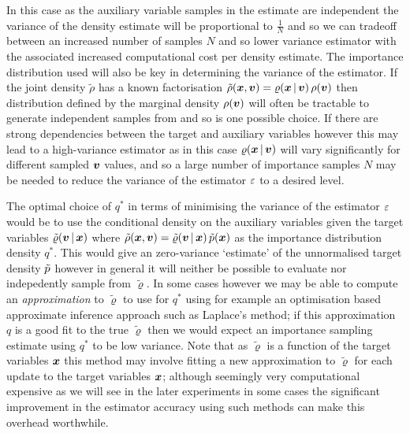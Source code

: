 In this case as the auxiliary variable samples in the estimate are independent the variance of the density estimate will be proportional to $\frac{1}{N}$ and so we can tradeoff between an increased number of samples $N$ and so lower variance estimator with the associated increased computational cost per density estimate. The importance distribution used will also be key in determining the variance of the estimator. If the joint density $\tilde{\rho}$ has a known factorisation $\tilde{\rho}(\boldsymbol{x},\boldsymbol{v}) = \varrho(\boldsymbol{x}\operatorname{|}\boldsymbol{v})\,\rho(\boldsymbol{v})$ then distribution defined by the marginal density $\rho(\boldsymbol{v})$ will often be tractable to generate independent samples from and so is one possible choice. If there are strong dependencies between the target and auxiliary variables however this may lead to a high-variance estimator as in this case $\varrho(\boldsymbol{x}\operatorname{|}\boldsymbol{v})$ will vary significantly for different sampled $\boldsymbol{v}$ values, and so a large number of importance samples $N$ may be needed to reduce the variance of the estimator $\varepsilon$ to a desired level. 

The optimal choice of $q^*$ in terms of minimising the variance of the estimator $\varepsilon$ would be to use the conditional density on the auxiliary variables given the target variables $\tilde{\varrho}(\boldsymbol{v}\operatorname{|}\boldsymbol{x})$ where $\tilde{\rho}(\boldsymbol{x},\boldsymbol{v}) = \tilde{\varrho}(\boldsymbol{v}\operatorname{|}\boldsymbol{x})\,\tilde{p}(\boldsymbol{x})$ as the importance distribution density $q^*$. This would give an zero-variance `estimate' of the unnormalised target density $\tilde{p}$ however in general it will neither be possible to evaluate nor indepedently sample from $\tilde{\varrho}$. In some cases however we may be able to compute an \emph{approximation} to $\tilde{\varrho}$ to use for $q^*$ using for example an optimisation based approximate inference approach such as Laplace's method; if this approximation $q$ is a good fit to the true $\tilde{\varrho}$ then we would expect an importance sampling estimate using $q^*$ to be low variance. Note that as $\tilde{\varrho}$ is a function of the target variables $\boldsymbol{x}$ this method may involve fitting a new approximation to $\tilde{\varrho}$ for each update to the target variables $\boldsymbol{x}$; although seemingly very computational expensive as we will see in the later experiments in some cases the significant improvement in the estimator accuracy using such methods can make this overhead worthwhile.


